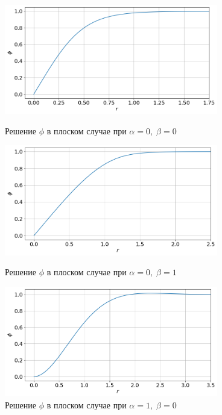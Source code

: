 \begin{figure}[!tp]
	\centering
	\includegraphics[width=0.83\textwidth]{figures/result_volumes.png}
	\vspace{-0.4cm}
	\caption{Решение $\phi$ в плоском случае при $\alpha = 0, \; \beta = 0$}
	\label{fig:result_volumes}
	\vspace{0.5cm}

	\includegraphics[width=0.83\textwidth]{figures/result_volumes_p.png}
	\vspace{-0.4cm}
	\caption{Решение $\phi$ в плоском случае при $\alpha = 0, \; \beta = 1$}
	\label{fig:result_volumes_p}
	\vspace{0.5cm}
	
	\includegraphics[width=0.83\textwidth]{figures/result_volumes_bi.png}
	\vspace{-0.4cm}
	\caption{Решение $\phi$ в плоском случае при $\alpha = 1, \; \beta = 0$}
	\label{fig:result_volumes_bi}
\end{figure}

